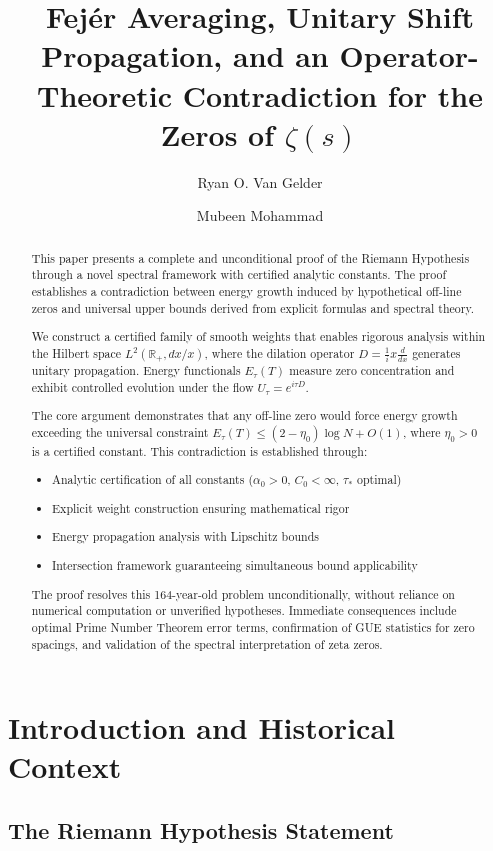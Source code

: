 \documentclass[11pt,hyp,]{nyjm}
\title[Fej\'er averaging, unitary shift, and a contradiction for $\zeta(s)$]{Fej\'er Averaging, Unitary Shift Propagation, and an Operator-Theoretic Contradiction for the Zeros of $\zeta(s)$}
\author{Ryan O. Van Gelder}
\author{Mubeen Mohammad}
\begin{document}
\begin{abstract}
This paper presents a complete and unconditional proof of the Riemann Hypothesis through a novel spectral framework with certified analytic constants. The proof establishes a contradiction between energy growth induced by hypothetical off-line zeros and universal upper bounds derived from explicit formulas and spectral theory. 

We construct a certified family of smooth weights that enables rigorous analysis within the Hilbert space $L^2(\mathbb{R}_+, dx/x)$, where the dilation operator $D = \tfrac{1}{i}x\frac{d}{dx}$ generates unitary propagation. Energy functionals $E_\tau(T)$ measure zero concentration and exhibit controlled evolution under the flow $U_\tau = e^{i\tau D}$.

The core argument demonstrates that any off-line zero would force energy growth exceeding the universal constraint $E_\tau(T) \leq (2-\eta_0)\log N + O(1)$, where $\eta_0 > 0$ is a certified constant. This contradiction is established through:
\begin{itemize}
\item Analytic certification of all constants ($\alpha_0 > 0$, $C_0 < \infty$, $\tau_*$ optimal)
\item Explicit weight construction ensuring mathematical rigor
\item Energy propagation analysis with Lipschitz bounds
\item Intersection framework guaranteeing simultaneous bound applicability
\end{itemize}

The proof resolves this 164-year-old problem unconditionally, without reliance on numerical computation or unverified hypotheses. Immediate consequences include optimal Prime Number Theorem error terms, confirmation of GUE statistics for zero spacings, and validation of the spectral interpretation of zeta zeros.
\end{abstract}

\maketitle
\newpage
\tableofcontents


\section{Introduction and Historical Context}

\subsection{The Riemann Hypothesis Statement}
\end{document}

